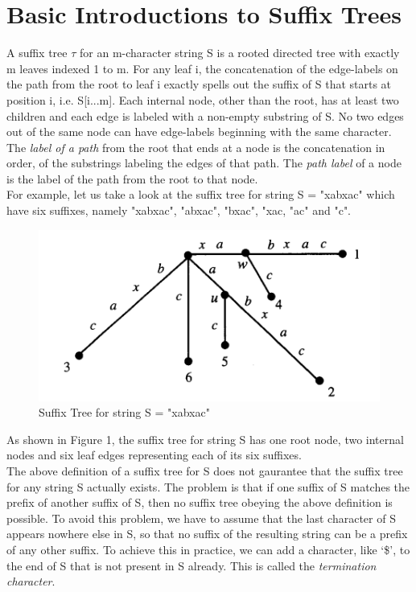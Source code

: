 \documentclass[11pt,a4paper]{article}
\begin{document}
\section{Basic Introductions to Suffix Trees}
\label{sec:intro}
A suffix tree \begin{math}\tau\end{math} for an m-character string S is a rooted directed tree with exactly m leaves indexed 1 to m. For any leaf i, the concatenation of the edge-labels on the path from the root to leaf i exactly spells out the suffix of S that starts at position i, i.e. S[i...m]. Each internal node, other than the root, has at least two children and each edge is labeled with a non-empty substring of S. No two edges out of the same node can have edge-labels beginning with the same character.
\\
The \emph{label of a path} from the root that ends at a node is the concatenation in order, of the substrings labeling the edges of that path. The \emph{path label} of a node is the label of the path from the root to that node.
\\
For example, let us take a look at the suffix tree for string S = "xabxac" which have six suffixes, namely "xabxac", "abxac", "bxac", "xac, "ac" and "c".
\begin{figure}[H]
    \centering
    \includegraphics{Images/image1.png}
    \caption{Suffix Tree for string S = "xabxac"}
    \label{fig:suffixtreeExample}
\end{figure}
As shown in Figure 1, the suffix tree for string S has one root node, two internal nodes and six leaf edges representing each of its six suffixes.
\\
The above definition of a suffix tree for S does not gaurantee that the suffix tree for any string S actually exists. The problem is that if one suffix of S matches the prefix of another suffix of S, then no suffix tree obeying the above definition is possible. To avoid this problem, we have to assume that the last character of S appears nowhere else in S, so that no suffix of the resulting string can be a prefix of any other suffix. To achieve this in practice, we can add a character, like `\$', to the end of S that is not present in S already. This is called the \emph{termination character}. 
\end{document}
